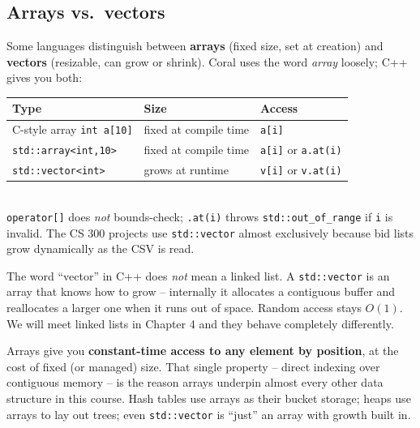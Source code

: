 \documentclass[11pt]{article}
\begin{document}
\subsection{Arrays vs.\ vectors}

Some languages distinguish between \textbf{arrays} (fixed size, set at
creation) and \textbf{vectors} (resizable, can grow or shrink). Coral
uses the word \emph{array} loosely; C++ gives you both:

\begin{examplebox}
\begin{tabular}{lll}
\textbf{Type} & \textbf{Size} & \textbf{Access} \\
\hline
C-style array \texttt{int a[10]} & fixed at compile time & \texttt{a[i]} \\
\texttt{std::array<int,10>} & fixed at compile time & \texttt{a[i]} or \texttt{a.at(i)} \\
\texttt{std::vector<int>} & grows at runtime & \texttt{v[i]} or \texttt{v.at(i)} \\
\end{tabular}\\[4pt]
\texttt{operator[]} does \emph{not} bounds-check; \texttt{.at(i)}
throws \texttt{std::out\_of\_range} if \texttt{i} is invalid. The CS
300 projects use \texttt{std::vector} almost exclusively because bid
lists grow dynamically as the CSV is read.
\end{examplebox}

\begin{notebox}
The word ``vector'' in C++ does \emph{not} mean a linked list. A
\texttt{std::vector} is an array that knows how to grow -- internally
it allocates a contiguous buffer and reallocates a larger one when it
runs out of space. Random access stays $O(1)$. We will meet linked
lists in Chapter 4 and they behave completely differently.
\end{notebox}

\begin{ideabox}
Arrays give you \textbf{constant-time access to any element by
position}, at the cost of fixed (or managed) size. That single
property -- direct indexing over contiguous memory -- is the reason
arrays underpin almost every other data structure in this course.
Hash tables use arrays as their bucket storage; heaps use arrays to
lay out trees; even \texttt{std::vector} is ``just'' an array with
growth built in.
\end{ideabox}
\end{document}
